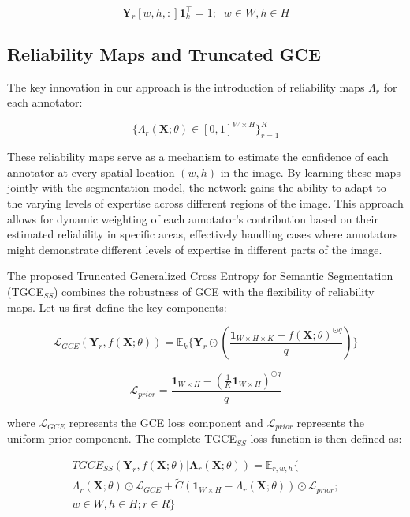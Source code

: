\begin{equation}
  \mathbf Y_r[w,h,:] \mathbf{1} ^ \top _ k = 1; \;\; w \in W, h \in H
\end{equation}

\subsection{Reliability Maps and Truncated GCE}

The key innovation in our approach is the introduction of reliability
maps $\Lambda_r$ for each annotator:

\begin{equation}
  \bigg\{ \Lambda_r (\mathbf X; \theta ) \in [0,1] ^{W\times H}
  \bigg\}_{r=1}^R
\end{equation}

These reliability maps serve as a mechanism to estimate
the confidence of each annotator at every spatial location $(w,h)$ in
the image. By learning these maps jointly with the segmentation
model, the network gains the ability to adapt to the varying levels
of expertise across different regions of the image. This approach
allows for dynamic weighting of each annotator's contribution based
on their estimated reliability in specific areas, effectively
handling cases where annotators might demonstrate different levels of
expertise in different parts of the image.

The proposed Truncated Generalized Cross Entropy for Semantic
Segmentation (TGCE$_{SS}$) combines the robustness of GCE with the
flexibility of reliability maps. Let us first define the key components:

\begin{equation}
  \mathcal{L}_{GCE}(\mathbf{Y}_r, f(\mathbf{X};\theta)) =
  \mathbb{E}_{k} \Bigg\{
    \mathbf{Y}_r \odot \left(
      \frac{\mathbf{1}_{W\times H \times K} - f(\mathbf{X};\theta)^{\odot
  q}}{q} \right) \Bigg\}
\end{equation}

\begin{equation}
  \mathcal{L}_{prior} = \frac{\mathbf{1}_{W\times H} -
  \left(\frac{1}{K} \mathbf{1}_{W\times H}\right)^{\odot q}}{q}
\end{equation}

where $\mathcal{L}_{GCE}$ represents the GCE loss component and
$\mathcal{L}_{prior}$ represents the uniform prior component. The
complete TGCE$_{SS}$ loss function is then defined as:

\begin{equation}
  \begin{split}
    TGCE_{SS}(\mathbf{Y}_r,f(\mathbf{X};\theta) |
    \mathbf{\Lambda}_r(\mathbf{X};\theta)) = \mathbb{E}_{r,w,h} \Bigg\{
      \\
      \Lambda_r(\mathbf{X};\theta) \odot
      \mathcal{L}_{GCE} +
      \tilde C \left(\mathbf{1}_{W\times H} -
      \Lambda_r(\mathbf{X};\theta)\right) \odot \mathcal{L}_{prior};
      \\
    w \in W, h \in H ; r \in R \Bigg\}
  \end{split}
\end{equation}


